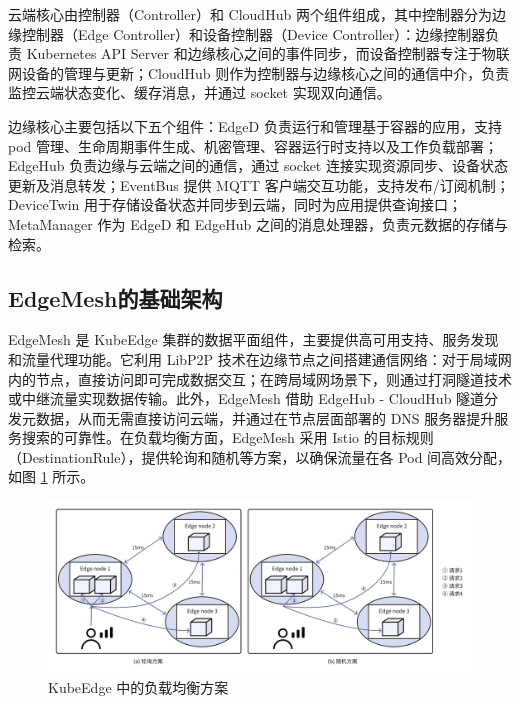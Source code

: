 云端核心由控制器（Controller）和 CloudHub 两个组件组成，其中控制器分为边缘控制器（Edge Controller）和设备控制器（Device Controller）：边缘控制器负责 Kubernetes API Server 和边缘核心之间的事件同步，而设备控制器专注于物联网设备的管理与更新；CloudHub 则作为控制器与边缘核心之间的通信中介，负责监控云端状态变化、缓存消息，并通过 socket 实现双向通信。

边缘核心主要包括以下五个组件：EdgeD 负责运行和管理基于容器的应用，支持 pod 管理、生命周期事件生成、机密管理、容器运行时支持以及工作负载部署；EdgeHub 负责边缘与云端之间的通信，通过 socket 连接实现资源同步、设备状态更新及消息转发；EventBus 提供 MQTT 客户端交互功能，支持发布/订阅机制；DeviceTwin 用于存储设备状态并同步到云端，同时为应用提供查询接口；MetaManager 作为 EdgeD 和 EdgeHub 之间的消息处理器，负责元数据的存储与检索。

\subsection{EdgeMesh的基础架构}

EdgeMesh 是 KubeEdge 集群的数据平面组件，主要提供高可用支持、服务发现和流量代理功能。它利用 LibP2P 技术在边缘节点之间搭建通信网络：对于局域网内的节点，直接访问即可完成数据交互；在跨局域网场景下，则通过打洞隧道技术或中继流量实现数据传输。此外，EdgeMesh 借助 EdgeHub - CloudHub 隧道分发元数据，从而无需直接访问云端，并通过在节点层面部署的 DNS 服务器提升服务搜索的可靠性。在负载均衡方面，EdgeMesh 采用 Istio 的目标规则（DestinationRule），提供轮询和随机等方案，以确保流量在各 Pod 间高效分配，如图 \ref{fig:2-3edgemesh} 所示。

\begin{figure}[ht]
  \centering
  \includegraphics[width=\linewidth]{pics/2-3edgemesh.png}
  \caption{KubeEdge 中的负载均衡方案}
  \label{fig:2-3edgemesh}
\end{figure}

